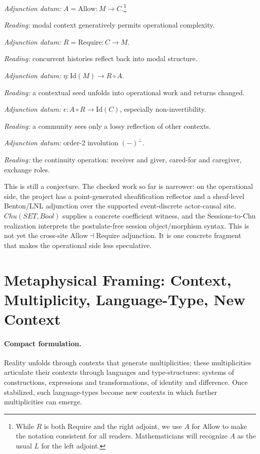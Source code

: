 \documentclass[11pt]{article}
\newcommand{\Allow}{\mathrm{Allow}}
\newcommand{\Require}{\mathrm{Require}}
\newcommand{\Id}{\mathrm{Id}}
\newenvironment{annotatedlist}{%
  \begin{description}[
    style=nextline,
    leftmargin=0pt,
    labelindent=0pt,
    labelsep=0pt,
    font=\normalfont\bfseries,
    itemsep=0.85em,
    topsep=0.35em
  ]%
}{\end{description}}
\newcommand{\annotation}[2]{\par\textit{#1:} #2}
\begin{document}
\begin{annotatedlist}
\item[Complexity]
\annotation{Adjunction datum}{\(A = \Allow : M \to C\).\footnote{While \(R\) is both Require and the right adjoint, we use \(A\) for Allow to make the notation consistent for all readers. Mathematicians will recognize \(A\) as the usual \(L\) for the left adjoint.}}
\annotation{Reading}{modal context generatively permits operational complexity.}

\item[Evolution]
\annotation{Adjunction datum}{\(R = \Require : C \to M\).}
\annotation{Reading}{concurrent histories reflect back into modal structure.}

\item[Praxis]
\annotation{Adjunction datum}{\(\eta : \Id(M) \to R \circ A\).}
\annotation{Reading}{a contextual seed unfolds into operational work and returns changed.}

\item[Anthropic-principle loss]
\annotation{Adjunction datum}{\(\epsilon : A \circ R \to \Id(C)\), especially non-invertibility.}
\annotation{Reading}{a community sees only a lossy reflection of other contexts.}

\item[Care]
\annotation{Adjunction datum}{order-2 involution \((-)^\perp\).}
\annotation{Reading}{the continuity operation: receiver and giver, cared-for and caregiver, exchange roles.}
\end{annotatedlist}

This is still a conjecture. The checked work so far is narrower: on the
operational side, the project has a point-generated sheafification reflector
and a sheaf-level Benton/LNL adjunction over the supported event-discrete
actor-causal site. \(Chu(SET,Bool)\) supplies a concrete coefficient witness,
and the Sessions-to-Chu realization interprets the postulate-free session
object/morphism syntax. This is not yet the cross-site
\(\Allow \dashv \Require\) adjunction. It is one concrete fragment that makes
the operational side less speculative.

\section{Metaphysical Framing: Context, Multiplicity, Language-Type, New Context}

\paragraph{Compact formulation.}
Reality unfolds through contexts that generate multiplicities; these
multiplicities articulate their contexts through languages and type-structures:
systems of constructions, expressions and transformations, of identity and
difference. Once stabilized, such language-types become new contexts in which
further multiplicities can emerge.
\end{document}
